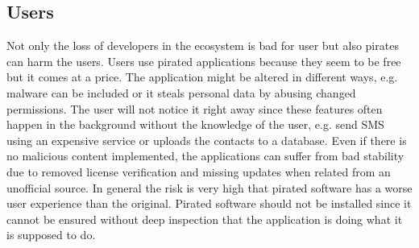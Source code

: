 \subsection{Users} \label{subsection:foundation-piracy-users}
Not only the loss of developers in the ecosystem is bad for user but also pirates can harm the users.
Users use pirated applications because they seem to be free but it comes at a price.
The application might be altered in different ways, e.g. malware can be included or it steals personal data by abusing changed permissions.
The user will not notice it right away since these features often happen in the background without the knowledge of the user, e.g. send SMS using an expensive service or uploads the contacts to a database.
Even if there is no malicious content implemented, the applications can suffer from bad stability due to removed license verification and missing updates when related from an unofficial source.
In general the risk is very high that pirated software has a worse user experience than the original.
Pirated software should not be installed since it cannot be ensured without deep inspection that the application is doing what it is supposed to do. \cite{bitdefenderPlagiarism}\cite{lierschDeveloperThreats}
\newline





